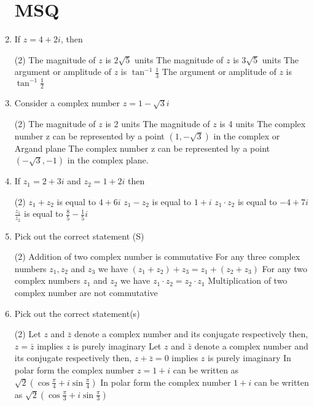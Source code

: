 \begin{enumerate}
	\section{MSQ}
	\item If $z=4+2 i$, then
	 \begin{tasks}(2)
		\task[\textbf{a.}] The magnitude of $z$ is $2 \sqrt{5}$ units
		\task[\textbf{b.}]The magnitude of $z$ is $3 \sqrt{5}$ units
		\task[\textbf{c.}] The argument or amplitude of $z$ is $\tan ^{-1} \frac{1}{3}$
		\task[\textbf{d.}]  The argument or amplitude of $z$ is $\tan ^{-1} \frac{1}{2}$
	\end{tasks}
	\item Consider a complex number $z=1-\sqrt{3} i$
	 \begin{tasks}(2)
		\task[\textbf{a.}]The magnitude of $z$ is 2 units
		\task[\textbf{b.}]The magnitude of $z$ is 4 units
		\task[\textbf{c.}]The complex number z can be represented by a point $(1,-\sqrt{3})$ in the complex or Argand plane
		\task[\textbf{d.}] The complex number z can be represented by a point $(-\sqrt{3},-1)$ in the complex plane.
	\end{tasks}
	\item If $z_{1}=2+3 i$ and $z_{2}=1+2 i$ then
	 \begin{tasks}(2)
		\task[\textbf{a.}] $z_{1}+z_{2}$ is equal to $4+6 i$
		\task[\textbf{b.}]$z_{1}-z_{2}$ is equal to $1+i$
		\task[\textbf{c.}]$z_{1} \cdot z_{2}$ is equal to $-4+7 i$
		\task[\textbf{d.}]  $\frac{z_{1}}{z_{2}}$ is equal to $\frac{8}{5}-\frac{1}{5} i$
	\end{tasks}
	\item Pick out the correct statement (S)
	 \begin{tasks}(2)
		\task[\textbf{a.}]Addition of two complex number is commutative
		\task[\textbf{b.}]For any three complex numbers $z_{1}, z_{2}$ and $z_{3}$ we have $\left(z_{1}+z_{2}\right)+z_{3}=z_{1}+\left(z_{2}+z_{3}\right)$
		\task[\textbf{c.}]For any two complex numbers $z_{1}$ and $z_{2}$ we have $z_{1} \cdot z_{2}=z_{2} \cdot z_{1}$
		\task[\textbf{d.}] Multiplication of two complex number are not commutative
	\end{tasks}
	\item Pick out the correct statement(s)
	 \begin{tasks}(2)
		\task[\textbf{a.}] Let $z$ and $\bar{z}$ denote a complex number and its conjugate respectively then, $z=\bar{z}$ implies $z$ is purely imaginary
		\task[\textbf{b.}]Let $z$ and $\bar{z}$ denote a complex number and its conjugate respectively then, $z+\bar{z}=0$ implies $z$ is purely imaginary
		\task[\textbf{c.}]In polar form the complex number $z=1+i$ can be written as $\sqrt{2}\left(\cos \frac{\pi}{4}+i \sin \frac{\pi}{4}\right)$
		\task[\textbf{d.}]  In polar form the complex number $1+i$ can be written as $\sqrt{2}\left(\cos \frac{\pi}{3}+i \sin \frac{\pi}{3}\right)$
	\end{tasks}
	
	
	
	
	
	
	
	
	
\end{enumerate}
